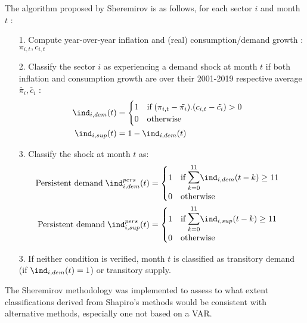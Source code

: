 The algorithm proposed by Sheremirov is as follows, for each sector $i$ and month $t$ :
\begin{itemize}
    \item[1.] Compute year-over-year inflation and (real) consumption/demand growth : $\pi_{i,t},c_{i,t}$
    \item[2.] Classify the sector $i$ as experiencing a demand shock at month $t$ if both inflation and consumption growth are over their 2001-2019 respective average $\tilde{\pi_i},\tilde{c_i}$ : 
    \begin{align*}
        \ind_{i,dem}(t) &= \begin{cases} 1 \quad \textrm{if} \; (\pi_{i,t}-\tilde{\pi_i}).(c_{i,t}-\tilde{c_i})>0 \\ 0 \quad \textrm{otherwise} \end{cases} \\ 
        \ind_{i,sup}(t) &= 1 - \ind_{i,dem}(t)
    \end{align*}
    \item[3.] Classify the shock at month $t$ as:
    \begin{align*}
        \textrm{Persistent demand} \; \ind_{i,dem}^{pers}(t) &= \begin{cases} 1 \quad \textrm{if} \; \mathlarger{\mathlarger{\sum}}_{k=0}^{11} \ind_{i,dem}(t-k) \geq 11 \\ 0 \quad \textrm{otherwise} \end{cases} \\ 
        \textrm{Persistent demand} \; \ind_{i,sup}^{pers}(t) &= \begin{cases} 1 \quad \textrm{if} \; \mathlarger{\mathlarger{\sum}}_{k=0}^{11} \ind_{i,sup}(t-k) \geq 11 \\ 0 \quad \textrm{otherwise} \end{cases} \\ 
    \end{align*}
    \item[3.] If neither condition is verified, month $t$ is classified as transitory demand (if $\ind_{i,dem}(t)=1$) or transitory supply.
\end{itemize}
\quad The Sheremirov methodology was implemented to assess to what extent classifications derived from Shapiro's methods would be consistent with alternative methods, especially one not based on a VAR.

\clearpage